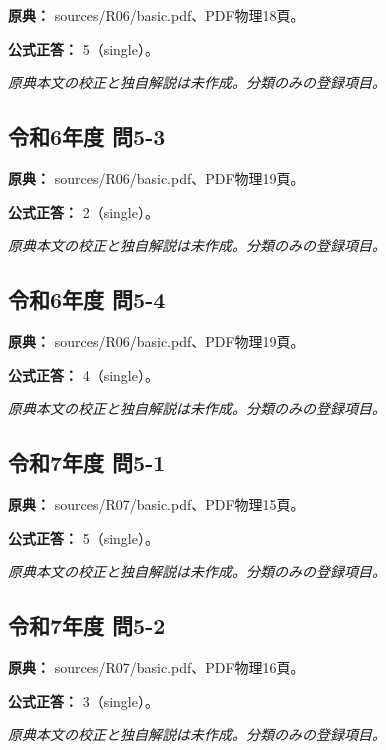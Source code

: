 \noindent\textbf{原典：} sources/R06/basic.pdf、PDF物理18頁。

\textbf{公式正答：} 5（single）。

\par\textit{原典本文の校正と独自解説は未作成。分類のみの登録項目。}

\subsection{令和6年度 問5-3}
\label{q:r06-reg-basic-5-3}

\noindent\textbf{原典：} sources/R06/basic.pdf、PDF物理19頁。

\textbf{公式正答：} 2（single）。

\par\textit{原典本文の校正と独自解説は未作成。分類のみの登録項目。}

\subsection{令和6年度 問5-4}
\label{q:r06-reg-basic-5-4}

\noindent\textbf{原典：} sources/R06/basic.pdf、PDF物理19頁。

\textbf{公式正答：} 4（single）。

\par\textit{原典本文の校正と独自解説は未作成。分類のみの登録項目。}

\subsection{令和7年度 問5-1}
\label{q:r07-reg-basic-5-1}

\noindent\textbf{原典：} sources/R07/basic.pdf、PDF物理15頁。

\textbf{公式正答：} 5（single）。

\par\textit{原典本文の校正と独自解説は未作成。分類のみの登録項目。}

\subsection{令和7年度 問5-2}
\label{q:r07-reg-basic-5-2}

\noindent\textbf{原典：} sources/R07/basic.pdf、PDF物理16頁。

\textbf{公式正答：} 3（single）。

\par\textit{原典本文の校正と独自解説は未作成。分類のみの登録項目。}

